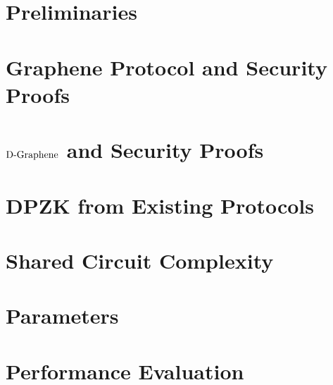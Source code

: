\documentclass[USenglish,oneside,twocolumn]{article}
\begin{document}
\section{Preliminaries}
\label{app:securitydef}

\section{Graphene Protocol and Security Proofs}
\label{app:grapehene_securityproofs}

\section{$\text{D-Graphene}$ and Security Proofs}
\label{app:dp_grapehene_securityproofs}

\section{DPZK from Existing Protocols}
\label{app:dpzk_others}

\section*{ }
\label{app:DP_Protocols}

\section{Shared Circuit Complexity}
\label{app:shared_ciruit}

\section{Parameters}
\label{app:Parameters}

\section{Performance Evaluation}
\label{sec:performancecompare}


\end{document}
